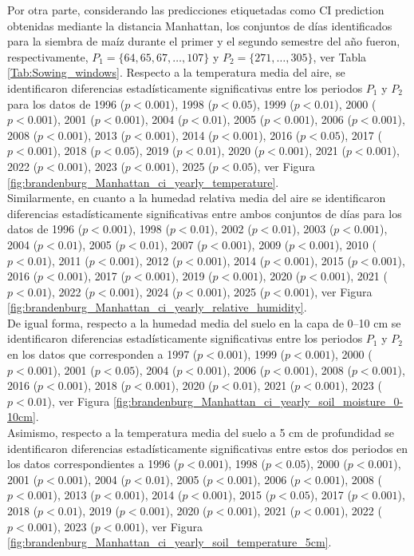 Por otra parte, considerando las predicciones etiquetadas como CI prediction obtenidas mediante la distancia Manhattan, los conjuntos de días identificados para la siembra de maíz durante el primer y el segundo semestre del año fueron, respectivamente, $P_1=\{64, 65,67,\ldots,107\}$ y $P_2=\{271,\ldots,305\}$, ver Tabla \ref{Tab:Sowing_windows}. Respecto a la temperatura media del aire, se identificaron diferencias estadísticamente significativas entre los periodos $P_1$ y $P_2$ para los datos de 1996	($p<0.001$), 1998	($p<0.05$), 1999	($p<0.01$), 2000	($p<0.001$), 2001	($p<0.001$), 2004	($p<0.01$), 2005	($p<0.001$), 2006	($p<0.001$), 2008	($p<0.001$), 2013	($p<0.001$), 2014	($p<0.001$), 2016	($p<0.05$), 2017	($p<0.001$), 2018	($p<0.05$), 2019	($p<0.01$), 2020	($p<0.001$), 2021	($p<0.001$), 2022	($p<0.001$), 2023	($p<0.001$), 2025	($p<0.05$), ver Figura \ref{fig:brandenburg_Manhattan_ci_yearly_temperature}.\\

Similarmente, en cuanto a la humedad relativa media del aire se identificaron diferencias estadísticamente significativas entre ambos conjuntos de días para los datos de 1996	($p<0.001$), 1998	($p<0.01$), 2002	($p<0.01$), 2003	($p<0.001$), 2004	($p<0.01$), 2005	($p<0.01$), 2007	($p<0.001$), 2009	($p<0.001$), 2010	($p<0.01$), 2011	($p<0.001$), 2012	($p<0.001$), 2014	($p<0.001$), 2015	($p<0.001$), 2016	($p<0.001$), 2017	($p<0.001$), 2019	($p<0.001$), 2020	($p<0.001$), 2021	($p<0.01$), 2022	($p<0.001$), 2024	($p<0.001$), 2025	($p<0.001$), ver Figura \ref{fig:brandenburg_Manhattan_ci_yearly_relative_humidity}.\\


De igual forma, respecto a la humedad media del suelo en la capa de 0--10 cm se identificaron diferencias estadísticamente significativas entre los periodos $P_1$ y $P_2$ en los datos que corresponden a 1997	($p<0.001$), 1999	($p<0.001$), 2000	($p<0.001$), 2001	($p<0.05$), 2004	($p<0.001$), 2006	($p<0.001$), 2008	($p<0.001$), 2016	($p<0.001$), 2018	($p<0.001$), 2020	($p<0.01$), 2021	($p<0.001$), 2023	($p<0.01$), ver Figura \ref{fig:brandenburg_Manhattan_ci_yearly_soil_moisture_0-10cm}.\\

Asimismo, respecto a la temperatura media del suelo a 5 cm de profundidad se identificaron diferencias estadísticamente significativas entre estos dos periodos en los datos correspondientes a 1996	($p<0.001$), 1998	($p<0.05$), 2000	($p<0.001$), 2001	($p<0.001$), 2004	($p<0.01$), 2005	($p<0.001$), 2006	($p<0.001$), 2008	($p<0.001$), 2013	($p<0.001$), 2014	($p<0.001$), 2015	($p<0.05$), 2017	($p<0.001$), 2018	($p<0.01$), 2019	($p<0.001$), 2020	($p<0.001$), 2021	($p<0.001$), 2022	($p<0.001$), 2023	($p<0.001$), ver Figura \ref{fig:brandenburg_Manhattan_ci_yearly_soil_temperature_5cm}.\\

